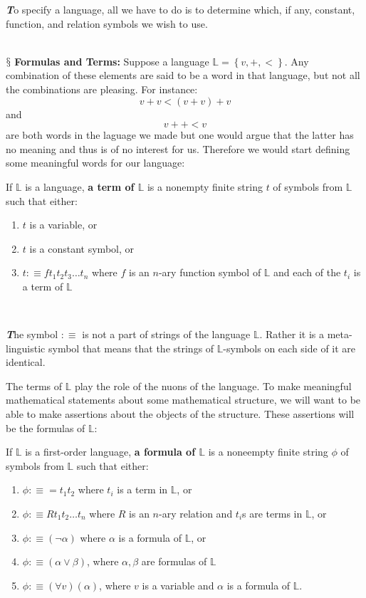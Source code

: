 \documentclass[9pt,a4paper, twocolumn]{article}
\newenvironment{callout}
	{\begin{calloutbox}\color{charcoal}\textbf\textit}
	{\end{calloutbox}}
\newcommand{\newpoint}[1]{\ \\ \indent$\mathsection$ \textbf{#1}}
\newcommand{\curveL}{\mathbb{L} }
\begin{document}
        \begin{callout}
            To specify a language, all we have to do is to determine which, if any, constant, function, and relation symbols we wish to use.
        \end{callout}
        \newpoint{Formulas and Terms:} Suppose a language $\curveL = \left\{v, + , <\right\}$. Any combination of these elements are said to be a word in that language, but not all the combinations are pleasing. For instance:
        $$
        v + v < (v + v) + v
        $$
        and 
        $$
        v ++<v
        $$
        are both words in the laguage we made but one would argue that the latter has no meaning and thus is of no interest for us. Therefore we would start defining some meaningful words for our language:
        \begin{define}
            If $\curveL$ is a language, \textbf{a term of $\curveL$} is a nonempty finite string $t$ of symbols from $\curveL$ such that either:
            \begin{enumerate}
                \item $t$ is a variable, or
                \item $t$ is a constant symbol, or
                \item $t:\equiv ft_1t_2t_3\dots t_n$ where $f$ is an $n$-ary function symbol of $\curveL$ and each of the $t_i$ is a term of $\curveL$
            \end{enumerate}
            \
        \end{define}
        \begin{callout}
            The symbol $:\equiv$ is not a part of strings of the language $\curveL$. Rather it is a meta-linguistic symbol that means that the strings of $\curveL$-symbols on each side of it are identical.
        \end{callout}
        The terms of $\curveL$ play the role of the nuons of the language. To make meaningful mathematical statements about some mathematical structure, we will want to be able to make assertions about the objects of the structure. These assertions will be the formulas of $\curveL$:
        \begin{define}
            If $\curveL$ is a first-order language, \textbf{a formula of $\curveL$} is a noneempty finite string $\phi$ of symbols from $\curveL$ such that either:
            \begin{enumerate}
                \item $\phi:\equiv = t_1t_2$ where $t_i$ is a term in $\curveL$, or
                \item $\phi:\equiv Rt_1t_2\dots t_n$ where $R$ is an $n$-ary relation and $t_i$s are terms in $\curveL$, or
                \item $\phi :\equiv (\neg\alpha)$ where $\alpha$ is a formula of $\curveL$, or
                \item $\phi:\equiv (\alpha\lor\beta)$, where $\alpha, \beta$ are formulas of $\curveL$
                \item $\phi:\equiv (\forall v)(\alpha)$, where $v$ is a variable and $\alpha$ is a formula of $\curveL$.
            \end{enumerate}
        \end{define}
\end{document}

